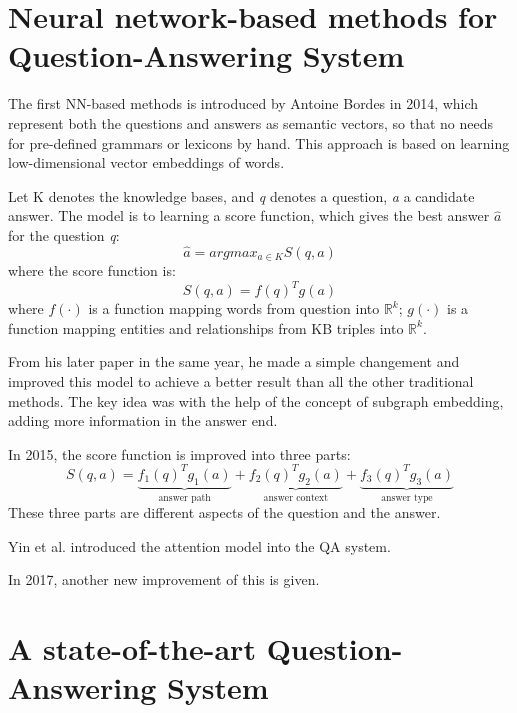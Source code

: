\documentclass[12pt]{article}
\numberwithin{equation}{section}
\begin{document}
\section{Neural network-based methods for Question-Answering System}
	The first NN-based methods is introduced by Antoine Bordes in 2014\citep{bordes2014open}, which represent both the questions and answers as semantic vectors, so that no needs for pre-defined grammars or lexicons by hand. This approach is based on learning low-dimensional vector embeddings of words. \par
	Let K denotes the knowledge bases, and {\it q} denotes a question, {\it a} a candidate answer. The model is to learning a score function, which gives the best answer $\hat{a}$ for the question {\it q}: 
	\begin{equation}
		\hat{a} = argmax_{a \in K} S(q, a)
	\end{equation}
where the score function is:
	\begin{equation}
		S(q,a) = f(q)^T g(a)
	\end{equation} 
where $f(\cdot)$ is a function mapping words from question into $\mathbb{R}^k$; $g(\cdot)$ is a function mapping entities and relationships from KB triples into $\mathbb{R}^k$. \par 
	From his later paper in the same year\citep{bordes2014question}, he made a simple changement and improved this model to achieve a better result than all the other traditional methods. The key idea was with the help of the concept of subgraph embedding, adding more information in the answer end.\par
	In 2015, the score function is improved into three parts\citep{dong2015question}:
	\begin{equation}
		S(q,a) = \underbrace{f_1(q)^T g_1(a)}_{\text{answer path}} + \underbrace{f_2(q)^T g_2(a)}_{\text{answer context}}  + \underbrace{f_3(q)^T g_3(a)}_{\text{answer type}} 
	\end{equation}
These three parts are different aspects of the question and the answer. \par
	Yin et al.\citep{yin2016simple} introduced the attention model into the QA system. \par
	In 2017, another new improvement of this is given\citep{hao2017end}.
\section{A state-of-the-art Question-Answering System\citep{chen2017reading}}
	
\renewcommand\refname{Reference}


\clearpage
\end{document}
